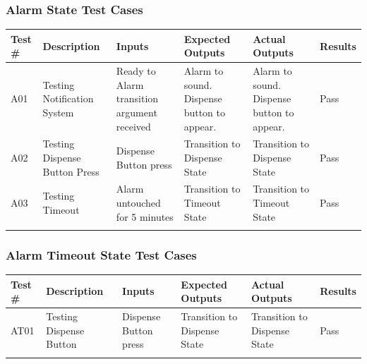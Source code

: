 \documentclass[12pt]{article}
\begin{document}
\subsubsection{Alarm State Test Cases}
\begin{tabularx}{\textwidth}{|X|X|X|X|X|X|}
        \hline
        Test \#     & Description     & Inputs      & Expected Outputs  & Actual Outputs    & Results   \\
        \hline
         A01     & Testing Notification System     & Ready to Alarm transition argument received     & Alarm to sound. Dispense button to appear.   & Alarm to sound. Dispense button to appear.     & Pass   \\
        \hline
         A02     & Testing Dispense Button Press     & Dispense Button press     & Transition to Dispense State   & Transition to Dispense State     & Pass   \\
        \hline
         A03     & Testing Timeout     & Alarm untouched for 5 minutes     & Transition to Timeout State   & Transition to Timeout State     & Pass   \\
        \hline
    \caption{Alarm State} %
\end{tabularx}

\subsubsection{Alarm Timeout State Test Cases}
\begin{tabularx}{\textwidth}{|X|X|X|X|X|X|}
        \hline
        Test \#     & Description     & Inputs      & Expected Outputs  & Actual Outputs    & Results   \\
        \hline
         AT01     & Testing Dispense Button    & Dispense Button press     & Transition to Dispense State   & Transition to Dispense State     & Pass   \\
        \hline
    \caption{Alarm Timeout State} %
\end{tabularx}
\end{document}
